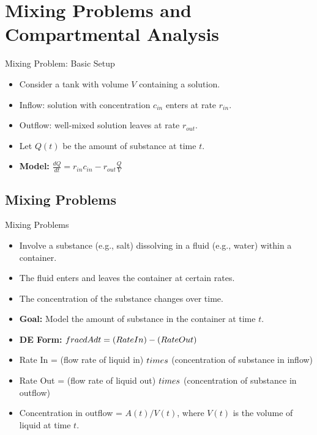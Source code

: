 \documentclass[10pt,aspectratio=169]{beamer}
\begin{document}
\section{Mixing Problems and Compartmental Analysis}
\begin{frame}{Mixing Problem: Basic Setup}
    \begin{itemize}
        \item Consider a tank with volume $V$ containing a solution.
        \item Inflow: solution with concentration $c_{in}$ enters at rate $r_{in}$.
        \item Outflow: well-mixed solution leaves at rate $r_{out}$.
        \item Let $Q(t)$ be the amount of substance at time $t$.
        \item \textbf{Model:} $\frac{dQ}{dt} = r_{in}c_{in} - r_{out}\frac{Q}{V}$
    \end{itemize}
\end{frame}

\subsection{Mixing Problems}
\begin{frame}{Mixing Problems}
    \begin{itemize}
        \item Involve a substance (e.g., salt) dissolving in a fluid (e.g., water) within a container.
        \item The fluid enters and leaves the container at certain rates.
        \item The concentration of the substance changes over time.
        \item \textbf{Goal:} Model the amount of substance in the container at time $t$.
        \item \textbf{DE Form:} $\\frac{dA}{dt} = (Rate In) - (Rate Out)$
        \item Rate In = (flow rate of liquid in) $\\times$ (concentration of substance in inflow)
        \item Rate Out = (flow rate of liquid out) $\\times$ (concentration of substance in outflow)
        \item Concentration in outflow = $A(t) / V(t)$, where $V(t)$ is the volume of liquid at time $t$.
    \end{itemize}
\end{frame}
\end{document}
